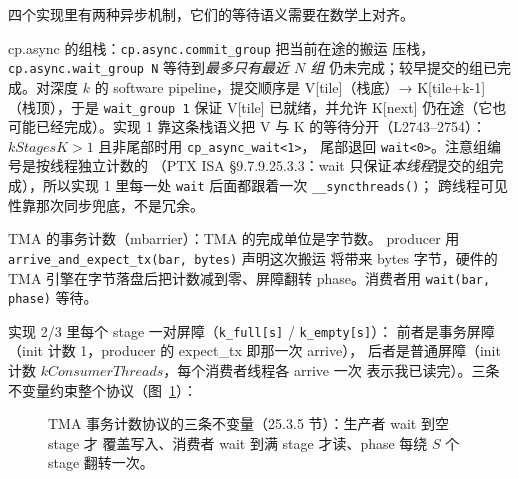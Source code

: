 四个实现里有两种异步机制，它们的等待语义需要在数学上对齐。

cp.async 的组栈：\texttt{cp.\allowbreak{}async.\allowbreak{}commit\_\allowbreak{}group} 把当前在途的搬运
压栈，\texttt{cp.\allowbreak{}async.\allowbreak{}wait\_\allowbreak{}group N} 等待到\emph{最多只有最近 $N$ 组}
仍未完成；较早提交的组已完成。对深度 $k$ 的 software pipeline，提交顺序是
V[tile]（栈底）→ K[tile+k-1]（栈顶），于是 \texttt{wait\_group 1} 保证
V[tile] 已就绪，并允许 K[next] 仍在途（它也可能已经完成）。实现 1
靠这条栈语义把 V 与 K 的等待分开（L2743--2754）：$kStagesK>1$ 且非尾部时用 \texttt{cp\_\allowbreak{}async\_\allowbreak{}wait\allowbreak{}<1>}，
尾部退回 \texttt{wait<0>}。注意组编号是按线程独立计数的
（PTX ISA §9.7.9.25.3.3：wait 只保证\emph{本线程}提交的组完成），所以实现 1
里每一处 \texttt{wait} 后面都跟着一次 \texttt{\_\allowbreak{}\_\allowbreak{}syncthreads\allowbreak{}()}；
跨线程可见性靠那次同步兜底，不是冗余。

TMA 的事务计数（mbarrier）：TMA 的完成单位是字节数。
producer 用 \texttt{arrive\_\allowbreak{}and\_\allowbreak{}expect\_\allowbreak{}tx(bar, bytes)} 声明这次搬运
将带来 bytes 字节，硬件的 TMA 引擎在字节落盘后把计数减到零、屏障翻转
phase。消费者用 \texttt{wait(bar, phase)} 等待。

实现 2/3 里每个 stage 一对屏障（\texttt{k\_full[s]} / \texttt{k\_empty[s]}）：
前者是事务屏障（init 计数 1，producer 的 expect\_tx 即那一次 arrive），
后者是普通屏障（init 计数 $kConsumerThreads$，每个消费者线程各 arrive 一次
表示我已读完）。三条不变量约束整个协议（图~\ref{fig:25-proto}）：

\begin{figure}[H]
\centering
{}
\caption{TMA 事务计数协议的三条不变量（25.3.5 节）：生产者 wait 到空 stage 才
覆盖写入、消费者 wait 到满 stage 才读、phase 每绕 $S$ 个 stage 翻转一次。}
\label{fig:25-proto}
\end{figure}

